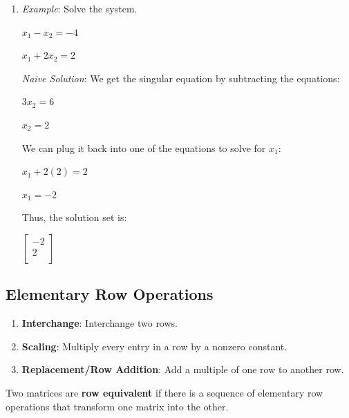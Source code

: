 \documentclass[12pt, letterpaper]{article}
\begin{document}
\begin{enumerate}
  \item \textit{Example}: Solve the system.

    {\centering

      $ x_1 - x_2 = -4 $

      $ x_1 + 2x_2 = 2 $

    }

    \bigskip

    \textit{Naive Solution}: We get the singular equation by
    subtracting the equations: %

    {\centering

      $ 3x_2 = 6 $

      $ x_2 = 2 $

    }

    \medskip

    We can plug it back into one of the equations to solve for $ x_1 $:

    {\centering

      $ x_1 + 2(2) = 2 $

      $ x_1 = -2 $

    }

    \medskip

    Thus, the solution set is:

    {\centering

      $
      \begin{bmatrix}
        -2 \\
        2 \\
      \end{bmatrix}$

    }

\end{enumerate}

\subsection*{Elementary Row Operations}

\begin{enumerate}
  \item \textbf{Interchange}: Interchange two rows.
  \item \textbf{Scaling}: Multiply every entry in a row by a nonzero constant.
  \item \textbf{Replacement/Row Addition}: Add a multiple of one row
    to another row.
\end{enumerate}

Two matrices are \textbf{row equivalent} if there is a sequence of
elementary row operations that transform one matrix into the other.
\end{document}
